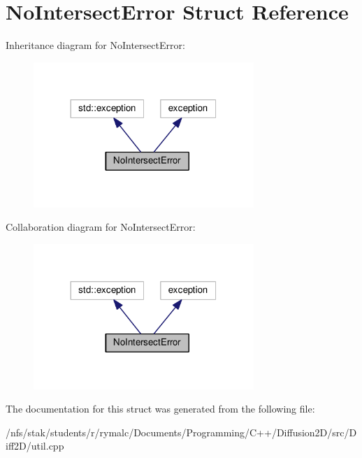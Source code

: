 \hypertarget{structNoIntersectError}{\section{No\+Intersect\+Error Struct Reference}
\label{structNoIntersectError}
}


Inheritance diagram for No\+Intersect\+Error\+:\nopagebreak
\begin{figure}[H]
\begin{center}
\leavevmode
\includegraphics[width=236pt]{structNoIntersectError__inherit__graph}
\end{center}
\end{figure}


Collaboration diagram for No\+Intersect\+Error\+:\nopagebreak
\begin{figure}[H]
\begin{center}
\leavevmode
\includegraphics[width=236pt]{structNoIntersectError__coll__graph}
\end{center}
\end{figure}


The documentation for this struct was generated from the following file\+:\begin{DoxyCompactItemize}
\item 
/nfs/stak/students/r/rymalc/\+Documents/\+Programming/\+C++/\+Diffusion2\+D/src/\+Diff2\+D/util.\+cpp\end{DoxyCompactItemize}
